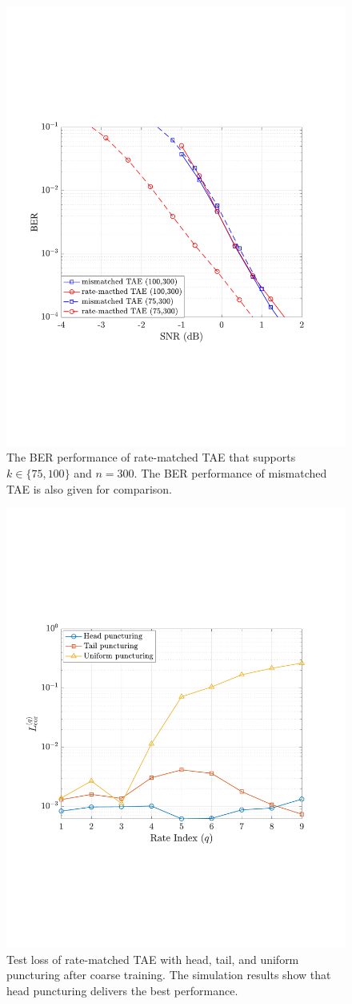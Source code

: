 \documentclass [PhD] {uclathes}
\begin{document}
\begin{figure}[t] 
    \centering
      \includegraphics[width=0.5\linewidth]{figures/BER_75_300.pdf}
      \caption{The BER performance of rate-matched TAE that supports $k\in\{75, 100\}$ and $n=300$. The BER performance of mismatched TAE is also given for comparison.}
      \label{fig: FER_75_300}
\end{figure}
\begin{figure}[t] 
    \centering
      \includegraphics[width=0.5\linewidth]{figures/puncturing_invest.pdf}
      \caption{Test loss of rate-matched TAE with head, tail, and uniform puncturing after coarse training. The simulation results show that head puncturing delivers the best performance.}
      \label{fig: Validation_Loss}
\end{figure}
\end{document}

